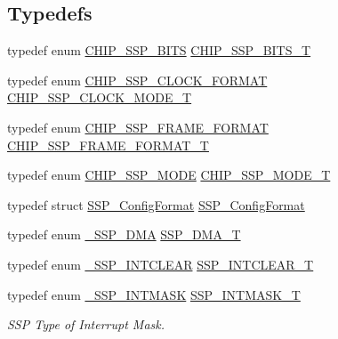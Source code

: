 \subsection*{Typedefs}
\begin{DoxyCompactItemize}
\item 
typedef enum \hyperlink{group__SSP__17XX__40XX_ga2f99e08511788c146ae9b35023e4a61c}{C\+H\+I\+P\+\_\+\+S\+S\+P\+\_\+\+B\+I\+TS} \hyperlink{group__SSP__17XX__40XX_ga4e348748c4fb42ef94c2cbd968a43648}{C\+H\+I\+P\+\_\+\+S\+S\+P\+\_\+\+B\+I\+T\+S\+\_\+T}
\item 
typedef enum \hyperlink{group__SSP__17XX__40XX_gab423240914ad746147aeb31f483e9553}{C\+H\+I\+P\+\_\+\+S\+S\+P\+\_\+\+C\+L\+O\+C\+K\+\_\+\+F\+O\+R\+M\+AT} \hyperlink{group__SSP__17XX__40XX_ga12dec81e345a9ffbefd6a1fae5759e09}{C\+H\+I\+P\+\_\+\+S\+S\+P\+\_\+\+C\+L\+O\+C\+K\+\_\+\+M\+O\+D\+E\+\_\+T}
\item 
typedef enum \hyperlink{group__SSP__17XX__40XX_gad3ae555ad43caa2b2a47bc4769d8fe50}{C\+H\+I\+P\+\_\+\+S\+S\+P\+\_\+\+F\+R\+A\+M\+E\+\_\+\+F\+O\+R\+M\+AT} \hyperlink{group__SSP__17XX__40XX_ga207687847d9ab8385057ddeca53c2942}{C\+H\+I\+P\+\_\+\+S\+S\+P\+\_\+\+F\+R\+A\+M\+E\+\_\+\+F\+O\+R\+M\+A\+T\+\_\+T}
\item 
typedef enum \hyperlink{group__SSP__17XX__40XX_ga2a375ed10848e3661b9b015fea1cf39b}{C\+H\+I\+P\+\_\+\+S\+S\+P\+\_\+\+M\+O\+DE} \hyperlink{group__SSP__17XX__40XX_gaced971159acfb5b4f06caa5b02f5a680}{C\+H\+I\+P\+\_\+\+S\+S\+P\+\_\+\+M\+O\+D\+E\+\_\+T}
\item 
typedef struct \hyperlink{structSSP__ConfigFormat}{S\+S\+P\+\_\+\+Config\+Format} \hyperlink{group__SSP__17XX__40XX_ga0c59381b3e253fe86244ec98a53a7d79}{S\+S\+P\+\_\+\+Config\+Format}
\item 
typedef enum \hyperlink{group__SSP__17XX__40XX_gaee679ef8477b8e31bf174e66e2984caf}{\+\_\+\+S\+S\+P\+\_\+\+D\+MA} \hyperlink{group__SSP__17XX__40XX_ga026212e0116f9a1109fd221e6b0ac503}{S\+S\+P\+\_\+\+D\+M\+A\+\_\+T}
\item 
typedef enum \hyperlink{group__SSP__17XX__40XX_ga59cc14c5381f32c16286c45bd6a3ece0}{\+\_\+\+S\+S\+P\+\_\+\+I\+N\+T\+C\+L\+E\+AR} \hyperlink{group__SSP__17XX__40XX_gadc98b69a8cb7a5afef8dd81bebbfc66d}{S\+S\+P\+\_\+\+I\+N\+T\+C\+L\+E\+A\+R\+\_\+T}
\item 
typedef enum \hyperlink{group__SSP__17XX__40XX_gab6a0ac593093184dd21c95f53b30f4ef}{\+\_\+\+S\+S\+P\+\_\+\+I\+N\+T\+M\+A\+SK} \hyperlink{group__SSP__17XX__40XX_ga84198f10a9a371b8523c09a850399bf4}{S\+S\+P\+\_\+\+I\+N\+T\+M\+A\+S\+K\+\_\+T}
\begin{DoxyCompactList}\small\item\em S\+SP Type of Interrupt Mask. \end{DoxyCompactList}\item 

\end{DoxyCompactItemize}
